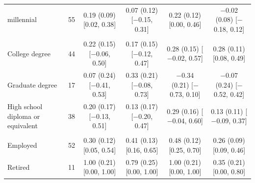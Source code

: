 \begin{table}[t]
\begin{tabular}{@{}lr*{4}{c}@{}}
\quad millennial & 55 & \makecell{0.19 (0.09)\\ {[}0.02, 0.38{]}} & \makecell{0.07 (0.12)\\ {[}$-$0.15, 0.31{]}} & \makecell{0.22 (0.12)\\ {[}0.00, 0.46{]}} & \makecell{$-$0.02 (0.08)\\ {[}$-$0.18, 0.12{]}} \\
\addlinespace
\multicolumn{6}{@{}l}{\textit{Education (N)}} \\
\quad College degree & 44 & \makecell{0.22 (0.15)\\ {[}$-$0.06, 0.50{]}} & \makecell{0.17 (0.15)\\ {[}$-$0.12, 0.47{]}} & \makecell{0.28 (0.15)\\ {[}$-$0.02, 0.57{]}} & \makecell{0.28 (0.11)\\ {[}0.08, 0.49{]}} \\
\quad Graduate degree & 17 & \makecell{0.07 (0.24)\\ {[}$-$0.41, 0.53{]}} & \makecell{0.33 (0.21)\\ {[}$-$0.08, 0.73{]}} & \makecell{$-$0.34 (0.21)\\ {[}$-$0.73, 0.10{]}} & \makecell{$-$0.07 (0.24)\\ {[}$-$0.52, 0.42{]}} \\
\quad High school diploma or equivalent & 38 & \makecell{0.20 (0.17)\\ {[}$-$0.13, 0.51{]}} & \makecell{0.13 (0.17)\\ {[}$-$0.20, 0.47{]}} & \makecell{0.29 (0.16)\\ {[}$-$0.04, 0.60{]}} & \makecell{0.13 (0.11)\\ {[}$-$0.09, 0.37{]}} \\
\addlinespace
\multicolumn{6}{@{}l}{\textit{Occupation (N)}} \\
\quad Employed & 52 & \makecell{0.30 (0.12)\\ {[}0.05, 0.54{]}} & \makecell{0.41 (0.13)\\ {[}0.16, 0.65{]}} & \makecell{0.48 (0.12)\\ {[}0.25, 0.70{]}} & \makecell{0.26 (0.09)\\ {[}0.09, 0.46{]}} \\
\quad Retired & 11 & \makecell{1.00 (0.21)\\ {[}0.00, 1.00{]}} & \makecell{0.79 (0.25)\\ {[}0.00, 1.00{]}} & \makecell{1.00 (0.21)\\ {[}0.00, 1.00{]}} & \makecell{0.35 (0.21)\\ {[}0.00, 0.80{]}} \\

\end{tabular}
\end{table}
